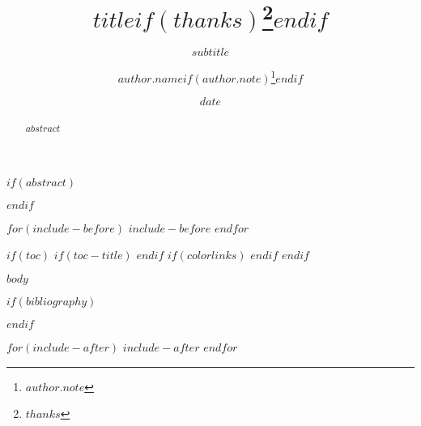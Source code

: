 \documentclass[
  $if(fontsize)$
    $fontsize$,
  $endif$
  a4paper
]{article}
\title{$title$$if(thanks)$\thanks{$thanks$}$endif$}
\subtitle{$subtitle$}
\author[$author.inst-id$]{$author.name$$if(author.note)$\thanks{$author.note$}$endif$}
\affil[$inst.id$]{$inst.name$}
\date{$date$}
\begin{document}
\begin{spacing}{1}
\maketitle
$if(abstract)$
\begin{abstract}
$abstract$
\end{abstract}
$endif$
\end{spacing}

$for(include-before)$
$include-before$
$endfor$

$if(toc)$
$if(toc-title)$
\renewcommand*\contentsname{$toc-title$}
$endif$
{
$if(colorlinks)$
\hypersetup{linkcolor=$if(toccolor)$$toccolor$$else$$endif$}
$endif$
\setcounter{tocdepth}{$toc-depth$}
\tableofcontents
}
$endif$

\setcounter{footnote}{0}
$body$

\clearpage

$if(bibliography)$

$endif$


$for(include-after)$
$include-after$
$endfor$
\end{document}
